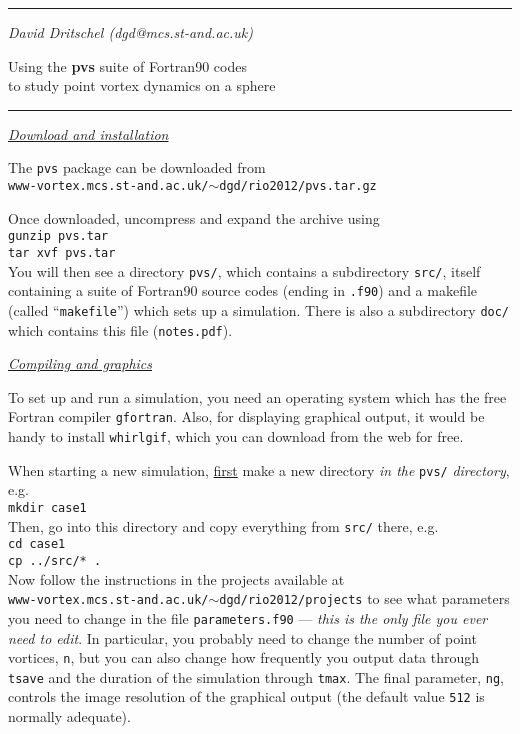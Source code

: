 \documentclass[12pt]{article}
\begin{document}
\thispagestyle{empty}
\hrule
\vspace{.25cm}
\hfill{\emph{\small David Dritschel \quad (dgd@mcs.st-and.ac.uk)}}

\begin{center}
\LARGE Using the {\bf pvs} suite of Fortran90 codes\\[2mm]
\LARGE to study point vortex dynamics on a sphere \\[2mm]
\end{center}

\hrule
\vspace{0.8cm}
\noindent\underline{\it Download and installation}

\medskip
The {\tt pvs} package can be downloaded from \\[2mm]
{\tt www-vortex.mcs.st-and.ac.uk/$\sim$dgd/rio2012/pvs.tar.gz}

\medskip
Once downloaded, uncompress and expand the archive using \\[2mm]
{\tt gunzip pvs.tar}\\
{\tt tar xvf pvs.tar}\\[2mm]
You will then see a directory {\tt pvs/}, which 
contains a subdirectory {\tt src/}, itself containing a 
suite of Fortran90 source codes (ending in {\tt .f90}) and
a makefile (called ``{\tt makefile}'') which sets up a simulation.  There
is also a subdirectory {\tt doc/} which contains this file ({\tt notes.pdf}).

\vspace{0.5cm}
\noindent\underline{\it Compiling and graphics}

\medskip
To set up and run a simulation, you need an operating system which has
the free Fortran compiler {\tt gfortran}.  Also, for displaying graphical
output, it would be handy to install {\tt whirlgif}, which you can download
from the web for free.

\medskip
When starting a new simulation, \underline{first} 
make a new directory {\it in the} {\tt pvs/} {\it directory}, e.g.\\[2mm]
{\tt mkdir case1}\\[2mm]
Then, go into this directory and copy everything from {\tt src/} there, 
e.g.\\[2mm]
{\tt cd case1}\\
{\tt cp ../src/* .}\\[2mm]
Now follow the instructions in the projects available at\\
{\tt www-vortex.mcs.st-and.ac.uk/$\sim$dgd/rio2012/projects} 
to see what parameters you need to change in the file 
{\tt parameters.f90} --- {\it this is the only file you ever need to edit}.
In particular, you probably need to change the number of point vortices,
{\tt n}, but you can also change how frequently you output data through 
{\tt tsave} and the duration of the simulation through {\tt tmax}.  The
final parameter, {\tt ng}, controls the image resolution of the graphical
output (the default value {\tt 512} is normally adequate).
\end{document}
